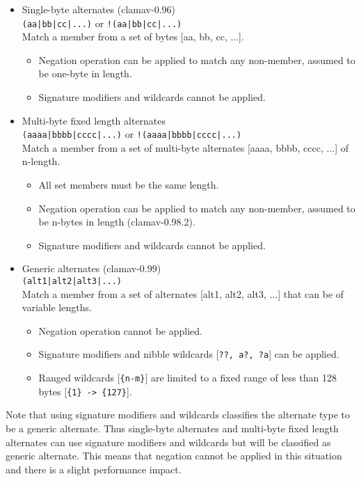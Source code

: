 \documentclass[a4paper,titlepage,12pt]{article}
\begin{document}
    \begin{itemize}
    \item Single-byte alternates (clamav-0.96)\\
      \verb+(aa|bb|cc|...)+ or \verb+!(aa|bb|cc|...)+\\
      Match a member from a set of bytes [aa, bb, cc, ...].
      \begin{itemize}
        \item Negation operation can be applied to match any non-member, assumed to be one-byte in length.
        \item Signature modifiers and wildcards cannot be applied.
      \end{itemize}
    \item Multi-byte fixed length alternates\\
      \verb+(aaaa|bbbb|cccc|...)+ or \verb+!(aaaa|bbbb|cccc|...)+\\
      Match a member from a set of multi-byte alternates [aaaa, bbbb, cccc, ...] of n-length.
      \begin{itemize}
        \item All set members must be the same length.
        \item Negation operation can be applied to match any non-member, assumed to be n-bytes in length (clamav-0.98.2).
        \item Signature modifiers and wildcards cannot be applied.
      \end{itemize}
    \item Generic alternates (clamav-0.99)\\
      \verb+(alt1|alt2|alt3|...)+\\
      Match a member from a set of alternates [alt1, alt2, alt3, ...] that can be of variable lengths.
      \begin{itemize}
        \item Negation operation cannot be applied.
        \item Signature modifiers and nibble wildcards [\verb+??, a?, ?a+] can be applied.
        \item Ranged wildcards [\verb+{n-m}+] are limited to a fixed range of less than 128 bytes [\verb+{1} -> {127}+].
      \end{itemize}
    \end{itemize}
    Note that using signature modifiers and wildcards classifies the alternate type to be a generic
    alternate. Thus single-byte alternates and multi-byte fixed length alternates can use signature
    modifiers and wildcards but will be classified as generic alternate. This means that negation
    cannot be applied in this situation and there is a slight performance impact.
\end{document}
